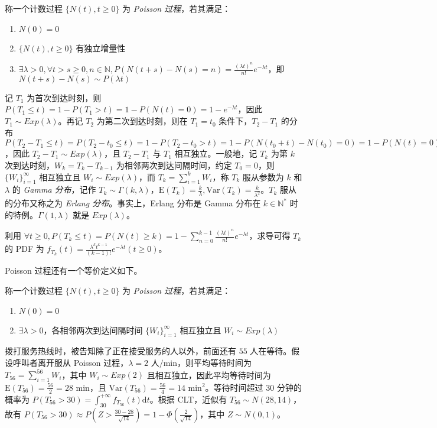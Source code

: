 \documentclass[../main.tex]{subfiles}
\begin{document}
\begin{definition}\label{def:6.3.3}
    称一个计数过程 $\{N(t),t\geq0\}$ 为 \emph{Poisson 过程}，若其满足：
    \begin{enumerate}
        \item $N(0)=0$
        \item $\{N(t),t\geq0\}$ 有独立增量性
        \item $\exists\lambda>0,\forall t>s\geq0,n\in\mathbb N,P(N(t+s)-N(s)=n)=\frac{(\lambda t)^n}{n!}e^{-\lambda t}$，即 $N(t+s)-N(s)\sim P(\lambda t)$
    \end{enumerate}
\end{definition}

记 $T_1$ 为首次到达时刻，则 $P(T_1\leq t)=1-P(T_1>t)=1-P(N(t)=0)=1-e^{-\lambda t}$，因此 $T_1\sim Exp(\lambda)$。再记 $T_2$ 为第二次到达时刻，则在 $T_1=t_0$ 条件下，$T_2-T_1$ 的分布 $P(T_2-T_1\leq t)=P(T_2-t_0\leq t)=1-P(T_2-t_0>t)=1-P(N(t_0+t)-N(t_0)=0)=1-P(N(t)=0)=1-e^{-\lambda t}$，因此 $T_2-T_1\sim Exp(\lambda)$，且 $T_2-T_1$ 与 $T_1$ 相互独立。一般地，记 $T_k$ 为第 $k$ 次到达时刻，$W_k=T_k-T_{k-1}$ 为相邻两次到达间隔时间，约定 $T_0=0$，则 $\{W_i\}_{i=1}^\infty$ 相互独立且 $W_i\sim Exp(\lambda)$，而 $T_k=\sum_{i=1}^kW_i$，称 $T_k$ 服从参数为 $k$ 和 $\lambda$ 的 \emph{Gamma 分布}，记作 $T_k\sim \Gamma(k,\lambda)$，$\mathrm E(T_k)=\frac k\lambda,\mathrm{Var}(T_k)=\frac k{\lambda^2}$。$T_k$ 服从的分布又称之为 \emph{Erlang 分布}。事实上，Erlang 分布是 Gamma 分布在 $k\in\mathbb N^*$ 时的特例。$\Gamma(1,\lambda)$ 就是 $Exp(\lambda)$。

利用 $\forall t\geq0,P(T_k\leq t)=P(N(t)\geq k)=1-\sum_{n=0}^{k-1}\frac{(\lambda t)^n}{n!}e^{-\lambda t}$，求导可得 $T_k$ 的 PDF 为 $f_{T_k}(t)=\frac{\lambda^kt^{k-1}}{(k-1)!}e^{-\lambda t}(t\geq 0)$。

Poisson 过程还有一个等价定义如下。

\begin{definition}\label{def:6.3.4}
    称一个计数过程 $\{N(t),t\geq0\}$ 为 \emph{Poisson 过程}，若其满足：
    \begin{enumerate}
        \item $N(0)=0$
        \item $\exists\lambda>0$，各相邻两次到达间隔时间 $\{W_i\}_{i=1}^\infty$ 相互独立且 $W_i\sim Exp(\lambda)$
    \end{enumerate}
\end{definition}

\begin{example}
    拨打服务热线时，被告知除了正在接受服务的人以外，前面还有 $55$ 人在等待。假设呼叫者离开服从 Poisson 过程，$\lambda=2\text{ 人/min}$，则平均等待时间为 $T_{56}=\sum_{i=1}^{56}W_i$，其中 $W_i\sim Exp(2)$ 且相互独立，因此平均等待时间为 $\mathrm E(T_{56})=\frac{56}{2}=28\text{ min}$，且 $\mathrm{Var}(T_{56})=\frac{56}{4}=14\text{ min}^2$。等待时间超过 $30$ 分钟的概率为 $P(T_{56}>30)=\int_{30}^{+\infty}f_{T_{56}}(t)\mathrm dt$。根据 CLT，近似有 $T_{56}\sim N(28,14)$，故有 $P(T_{56}>30)\approx P(Z>\frac{30-28}{\sqrt{14}})=1-\Phi(\frac2{\sqrt{14}})$，其中 $Z\sim N(0,1)$。
\end{example}
\end{document}
